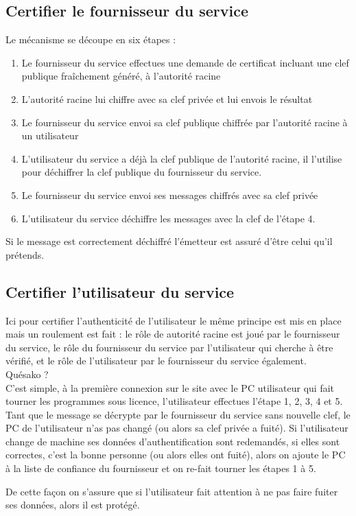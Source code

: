 \documentclass{article}
\begin{document}
\subsection{Certifier le fournisseur du service}

Le mécanisme se découpe en six étapes :
\begin{enumerate}
    \item Le fournisseur du service effectues une demande de certificat incluant une clef publique fraîchement généré, à l'autorité racine
    \item L'autorité racine lui chiffre avec sa clef privée et lui envois le résultat
    \item Le fournisseur du service envoi sa clef publique chiffrée par l'autorité racine à un utilisateur
    \item L'utilisateur du service a déjà la clef publique de l'autorité racine, il l'utilise pour déchiffrer la clef publique du fournisseur du service.
    \item Le fournisseur du service envoi ses messages chiffrés avec sa clef privée
    \item L'utilisateur du service déchiffre les messages avec la clef de l'étape 4.
\end{enumerate}

Si le message est correctement déchiffré l'émetteur est assuré d'être celui qu'il prétends.


\subsection{Certifier l'utilisateur du service}

Ici pour certifier l'authenticité de l'utilisateur le même principe est mis en place mais un roulement est fait : le rôle de autorité racine est joué par le fournisseur du service, le rôle du fournisseur du service par l'utilisateur qui cherche à être vérifié, et le rôle de l'utilisateur par le fournisseur du service également.\\
Quésako ?\\
C'est simple, à la première connexion sur le site avec le PC utilisateur qui fait tourner les programmes sous licence, l'utilisateur effectues l'étape 1, 2, 3, 4 et 5.  Tant que le message se décrypte par le fournisseur du service sans nouvelle clef, le PC de l'utilisateur n'as pas changé (ou alors sa clef privée a fuité). Si l'utilisateur change de machine ses données d'authentification sont redemandés, si elles sont correctes, c'est la bonne personne (ou alors elles ont fuité), alors on ajoute le PC à la liste de confiance du fournisseur et on re-fait tourner les étapes 1 à 5.

De cette façon on s'assure que si l'utilisateur fait attention à ne pas faire fuiter ses données, alors il est protégé.
\end{document}
